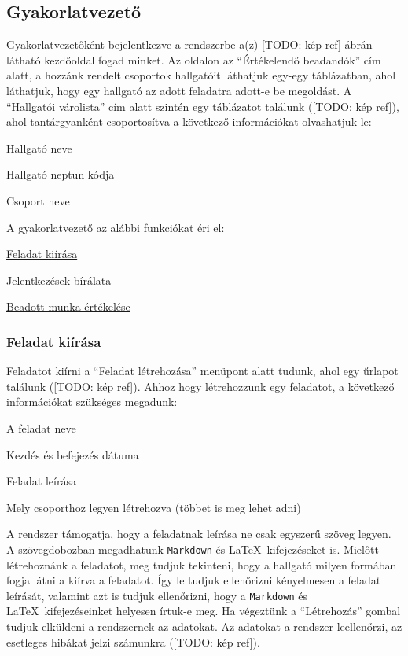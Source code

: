 \subsection{Gyakorlatvezető}\label{step:instructor-role}
Gyakorlatvezetőként bejelentkezve a rendszerbe a(z) [TODO: kép ref] ábrán látható kezdőoldal fogad minket. Az oldalon az ``Értékelendő beadandók'' cím alatt, a hozzánk rendelt csoportok hallgatóit láthatjuk egy-egy táblázatban, ahol láthatjuk, hogy egy hallgató az adott feladatra adott-e be megoldást. A ``Hallgatói várolista'' cím alatt szintén egy táblázatot találunk ([TODO: kép ref]), ahol tantárgyanként csoportosítva a következő információkat olvashatjuk le:
\begin{compactitem}
    \item Hallgató neve
	\item Hallgató neptun kódja
	\item Csoport neve
\end{compactitem}
A gyakorlatvezető az alábbi funkciókat éri el:
\begin{compactitem}
    \item \hyperref[step:instructor-create-assignment]{Feladat kiírása}
	\item \hyperref[step:instructor-pending]{Jelentkezések bírálata}
	\item \hyperref[step:instructor-eval]{Beadott munka értékelése}
\end{compactitem}
\subsubsection{Feladat kiírása}
\label{step:instructor-create-assignment}
Feladatot kiírni a ``Feladat létrehozása'' menüpont alatt tudunk, ahol egy űrlapot találunk ([TODO: kép ref]). Ahhoz hogy létrehozzunk egy feladatot, a következő információkat szükséges megadunk:
\begin{compactitem}
    \item A feladat neve
    \item Kezdés és befejezés dátuma
	\item Feladat leírása
	\item Mely csoporthoz legyen létrehozva (többet is meg lehet adni)
\end{compactitem}
A rendszer támogatja, hogy a feladatnak leírása ne csak egyszerű szöveg legyen. A szövegdobozban megadhatunk \texttt{Markdown} és \LaTeX\ kifejezéseket is. Mielőtt létrehoznánk a feladatot, meg tudjuk tekinteni, hogy a hallgató milyen formában fogja látni a kiírva a feladatot. Így le tudjuk ellenőrizni kényelmesen a feladat leírását, valamint azt is tudjuk ellenőrizni, hogy a \texttt{Markdown} és \LaTeX\ kifejezéseinket helyesen írtuk-e meg. Ha végeztünk a ``Létrehozás'' gombal tudjuk elküldeni a rendszernek az adatokat. Az adatokat a rendszer leellenőrzi, az esetleges hibákat jelzi számunkra ([TODO: kép ref]).
